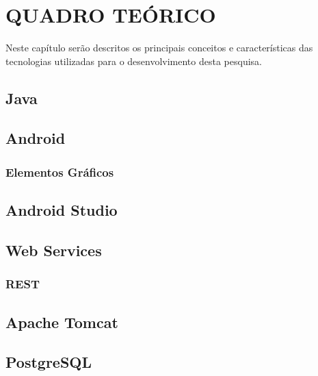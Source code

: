 \chapter{QUADRO TEÓRICO}

	\par Neste capítulo serão descritos os principais conceitos e características
das tecnologias utilizadas para o desenvolvimento desta pesquisa.
	
	\section{Java}
		

	\section{Android}
		

		\subsection{Elementos Gráficos}
			
	
	\section{Android Studio}
		
		
	\section{Web Services}
		

			\subsection{REST}
				
	\section{Apache Tomcat}
		
	
	\section{PostgreSQL}
		
	
